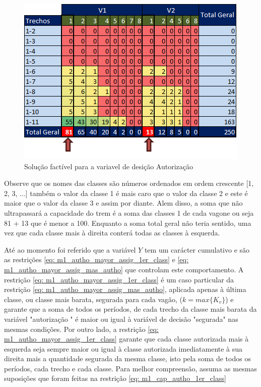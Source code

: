 \begin{figure}[!ht]
	\begin{center}
		\includegraphics[scale=0.7]{img/autorization.png}
		\caption{Solução factível para a variavel de desição Autorização}
		\label{fig: autorization}
	\end{center}
\end{figure}

Observe que os nomes das classes são números ordenados em ordem crescente [1, 2, 3, ...] também o valor da classe 1 é mais caro que o valor da classe 2 e este é maior que o valor da classe 3 e assim por diante. Alem disso, a soma que não ultrapassará a capacidade do trem é a soma das classes 1 de cada vagone ou seja 81 + 13 que é menor a 100. Enquanto a soma total geral não teria sentido, uma vez que cada classe mais à direita conterá todas as classes à esquerda.


Até ao momento foi referido que a variável $Y$ tem um carácter cumulativo e são as restrições \ref{eq: m1_autho_mayor_assig_1er_class} e \ref{eq: m1_autho_mayor_assig_mas_autho} que controlam este comportamento. A restrição \ref{eq: m1_autho_mayor_assig_1er_class} é um caso particular da restrição \ref{eq: m1_autho_mayor_assig_mas_autho}, aplicada apenas à última classe, ou classe mais barata, segurada para cada vagão, ($k=max\{K_v\}$) e garante que a soma de todos os períodos, de cada trecho da classe mais barata da variável "autorização " é maior ou igual à variável de decisão "segurada" nas mesmas condições. Por outro lado, a restrição \ref{eq: m1_autho_mayor_assig_1er_class} garante que cada classe autorizada mais à esquerda seja sempre maior ou igual à classe autorizada imediatamente à sua direita mais a quantidade segurada da mesma classe, isto pela soma de todos os períodos, cada trecho e cada classe. Para melhor compreensão, assuma as mesmas suposições que foram feitas na restrição \ref{eq: m1_cap_autho_1er_class} %


